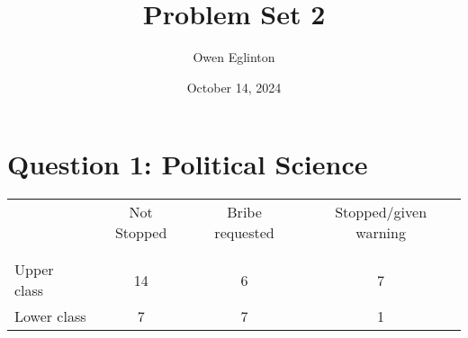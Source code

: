 \documentclass[12pt,letterpaper]{article}
\title{Problem Set 2}
\date{October 14, 2024}
\author{Owen Eglinton}
\begin{document}
	\maketitle

	\section*{Question 1: Political Science}

	\begin{table}[h!]
		\centering
		\begin{tabular}{l | c c c }
			& Not Stopped & Bribe requested & Stopped/given warning \\
			\\[-1.8ex] 
			\hline \\[-1.8ex]
			Upper class & 14 & 6 & 7 \\
			Lower class & 7 & 7 & 1 \\
			\hline
		\end{tabular}
	\end{table}
	
\end{document}
